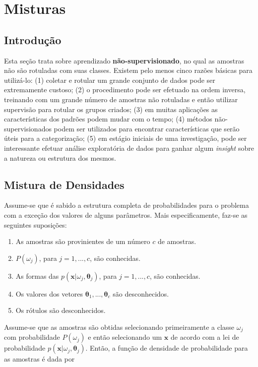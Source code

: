 \section{Misturas}

\subsection{Introdução}

Esta seção trata sobre aprendizado \textbf{não-supervisionado}, no qual as amostras não são rotuladas com suas classes. Existem pelo menos cinco razões básicas para utilizá-lo: (1) coletar e rotular um grande conjunto de dados pode ser extremamente custoso; (2) o procedimento pode ser efetuado na ordem inversa, treinando com um grande número de amostras não rotuladas e então utilizar supervisão para rotular os grupos criados; (3) em muitas aplicações as características dos padrões podem mudar com o tempo; (4) métodos não-supervisionados podem ser utilizados para encontrar características que serão úteis para a categorização; (5) em estágio iniciais de uma investigação, pode ser interessante efetuar análise exploratória de dados para ganhar algum \emph{insight} sobre a natureza ou estrutura dos mesmos.

\subsection{Mistura de Densidades}

Assume-se que é sabido a estrutura completa de probabilidades para o problema com a exceção dos valores de alguns parâmetros. Mais especificamente, faz-se as seguintes suposições:

\begin{enumerate}\itemsep0pt
    \item As amostras são provinientes de um número $c$ de amostras.
    \item $P(\omega_j)$, para $j = 1, ..., c$, são conhecidas.
    \item As formas das $p(\boldsymbol{x}|\omega_j, \boldsymbol{\theta}_j)$, para $j = 1, ..., c$, são conhecidas.
    \item Os valores dos vetores $\boldsymbol{\theta}_1, ..., \boldsymbol{\theta}_c$ são desconhecidos.
    \item Os rótulos são desconhecidos.
\end{enumerate}

Assume-se que as amostras são obtidas selecionando primeiramente a classe $\omega_j$ com probabilidade $P(\omega_j)$ e então selecionando um $\boldsymbol{x}$ de acordo com a lei de probabilidade $p(\boldsymbol{x}|\omega_j, \boldsymbol{\theta}_j)$. Então, a função de densidade de probabilidade para as amostras é dada por

